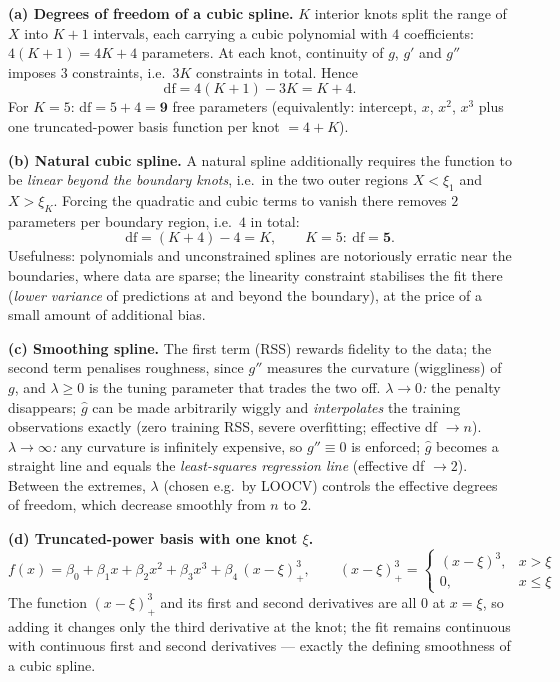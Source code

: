 \documentclass[11pt,a4paper]{article}
\begin{document}
\ifdefined\withsolutions
\begin{solutionbox}
\textbf{(a) Degrees of freedom of a cubic spline.}
$K$ interior knots split the range of $X$ into $K+1$ intervals, each carrying a cubic
polynomial with $4$ coefficients: $4(K+1)=4K+4$ parameters. At each knot, continuity of
$g$, $g'$ and $g''$ imposes $3$ constraints, i.e.\ $3K$ constraints in total. Hence
\[
  \mathrm{df}=4(K+1)-3K=K+4 .
\]
For $K=5$: $\mathrm{df}=5+4=\mathbf{9}$ free parameters (equivalently: intercept, $x$, $x^2$,
$x^3$ plus one truncated-power basis function per knot $=4+K$).

\medskip
\textbf{(b) Natural cubic spline.}
A natural spline additionally requires the function to be \emph{linear beyond the boundary
knots}, i.e.\ in the two outer regions $X<\xi_1$ and $X>\xi_K$. Forcing the quadratic and cubic
terms to vanish there removes $2$ parameters per boundary region, i.e.\ $4$ in total:
\[
  \mathrm{df}=(K+4)-4=K,\qquad K=5:\ \mathrm{df}=\mathbf{5}.
\]
Usefulness: polynomials and unconstrained splines are notoriously erratic near the boundaries,
where data are sparse; the linearity constraint stabilises the fit there
(\emph{lower variance} of predictions at and beyond the boundary), at the price of a small
amount of additional bias.

\medskip
\textbf{(c) Smoothing spline.}
The first term (RSS) rewards fidelity to the data; the second term penalises roughness, since
$g''$ measures the curvature (wiggliness) of $g$, and $\lambda\ge 0$ is the tuning parameter
that trades the two off.
\emph{$\lambda\to 0$:} the penalty disappears; $\hat{g}$ can be made arbitrarily wiggly and
\emph{interpolates} the training observations exactly (zero training RSS, severe overfitting;
effective df $\to n$).
\emph{$\lambda\to\infty$:} any curvature is infinitely expensive, so $g''\equiv 0$ is enforced;
$\hat{g}$ becomes a straight line and equals the \emph{least-squares regression line}
(effective df $\to 2$). Between the extremes, $\lambda$ (chosen e.g.\ by LOOCV) controls the
effective degrees of freedom, which decrease smoothly from $n$ to $2$.

\medskip
\textbf{(d) Truncated-power basis with one knot $\xi$.}
\[
  f(x)=\beta_0+\beta_1x+\beta_2x^2+\beta_3x^3+\beta_4\,(x-\xi)^3_+,
  \qquad
  (x-\xi)^3_+=\begin{cases}(x-\xi)^3, & x>\xi\\[0.5mm] 0, & x\le\xi\end{cases}
\]
The function $(x-\xi)^3_+$ and its first and second derivatives are all $0$ at $x=\xi$, so
adding it changes only the third derivative at the knot; the fit remains continuous with
continuous first and second derivatives --- exactly the defining smoothness of a cubic spline.
\end{solutionbox}
\fi
\end{document}
